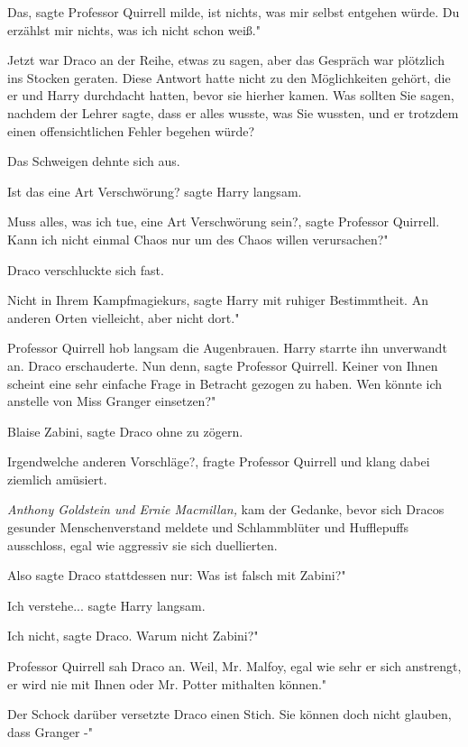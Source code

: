 \glqq{}Das\grqq{}, sagte Professor Quirrell milde, \glqq{}ist nichts, was mir
selbst entgehen würde. Du erzählst mir nichts, was ich nicht schon weiß."

Jetzt war Draco an der Reihe, etwas zu sagen, aber das Gespräch war plötzlich
ins Stocken geraten. Diese Antwort hatte nicht zu den Möglichkeiten gehört, die
er und Harry durchdacht hatten, bevor sie hierher kamen. Was sollten Sie sagen,
nachdem der Lehrer sagte, dass er alles wusste, was Sie wussten, und er trotzdem
einen offensichtlichen Fehler begehen würde?

Das Schweigen dehnte sich aus.

\glqq{}Ist das eine Art Verschwörung?\grqq{} sagte Harry langsam.

\glqq{}Muss alles, was ich tue, eine Art Verschwörung sein?\grqq{}, sagte
Professor Quirrell. \glqq{}Kann ich nicht einmal Chaos nur um des Chaos willen
verursachen?"

Draco verschluckte sich fast.

\glqq{}Nicht in Ihrem Kampfmagiekurs\grqq{}, sagte Harry mit ruhiger
Bestimmtheit. \glqq{}An anderen Orten vielleicht, aber nicht dort."

Professor Quirrell hob langsam die Augenbrauen. Harry starrte ihn unverwandt an.
Draco erschauderte. \glqq{}Nun denn\grqq{}, sagte Professor Quirrell. \glqq{}
Keiner von Ihnen scheint eine sehr einfache Frage in Betracht gezogen zu haben.
Wen könnte ich anstelle von Miss Granger einsetzen?"

\glqq{}Blaise Zabini\grqq{}, sagte Draco ohne zu zögern.

\glqq{}Irgendwelche anderen Vorschläge?\grqq{}, fragte Professor Quirrell und
klang dabei ziemlich amüsiert.

\emph{Anthony Goldstein und Ernie Macmillan,} kam der Gedanke, bevor sich Dracos
gesunder Menschenverstand meldete und Schlammblüter und Hufflepuffs ausschloss,
egal wie aggressiv sie sich duellierten.

Also sagte Draco stattdessen nur: \glqq{}Was ist falsch mit Zabini?"

\glqq{}Ich verstehe...\grqq{} sagte Harry langsam.

\glqq{}Ich nicht\grqq{}, sagte Draco. \glqq{}Warum nicht Zabini?"

Professor Quirrell sah Draco an. \glqq{}Weil, Mr. Malfoy, egal wie sehr er sich
anstrengt, er wird nie mit Ihnen oder Mr. Potter mithalten können."

Der Schock darüber versetzte Draco einen Stich. \glqq{}Sie können doch nicht
glauben, dass Granger -"

